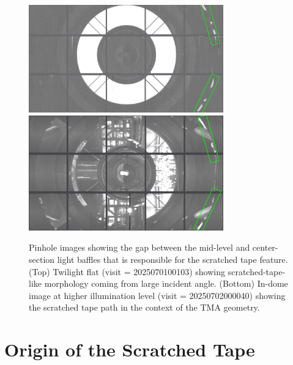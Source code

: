 \documentclass[SE,lsstdraft,authoryear,toc]{lsstdoc}
\begin{document}
\begin{figure}[t!]
    \centering
    \includegraphics[width=0.75\textwidth]{figures/quicklook_2025070100103.png}\\[+0.5em]
    \includegraphics[width=0.75\textwidth]{figures/quicklook_2025070200040.png}  \caption{\label{fig:pinhole} Pinhole images showing the gap between the mid-level and center-section light baffles that is responsible for the scratched tape feature. (Top) Twilight flat (visit = 2025070100103) showing scratched-tape-like morphology coming from large incident angle. (Bottom) In-dome image at higher illumination level (visit = 20250702000040) showing the scratched tape path in the context of the TMA geometry.}
\end{figure}

\section{Origin of the Scratched Tape}
\label{sec:cause}
\end{document}
